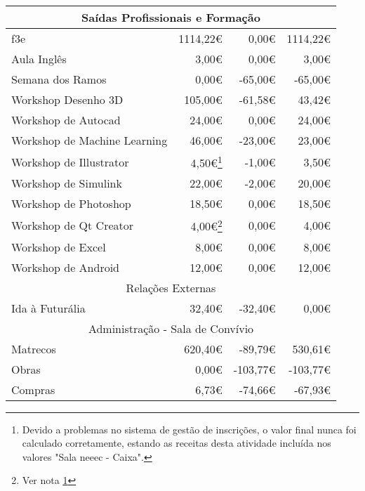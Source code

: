 \begin{longtable}{Xrrr}
\hline
\multicolumn{4}{c}{Saídas Profissionais e Formação} \\
\hline
\acrshort{f3e} & 1114,22€ & 0,00€ & 1114,22€ \\
Aula Inglês & 3,00€ & 0,00€ & 3,00€ \\
Semana dos Ramos & 0,00€ & -65,00€ & -65,00€ \\
Workshop Desenho 3D & 105,00€ & -61,58€ & 43,42€ \\
Workshop de Autocad & 24,00€ & 0,00€ & 24,00€ \\
Workshop de Machine Learning & 46,00€ & -23,00€ & 23,00€ \\
Workshop de Illustrator & 4,50€\footnote{\label{footnote:ws}Devido a problemas no sistema de gestão de inscrições, o valor final nunca foi calculado corretamente, estando as receitas desta atividade incluída nos valores "Sala \acrshort{neeec} - Caixa".} & -1,00€ & 3,50€ \\
Workshop de Simulink & 22,00€ & -2,00€ & 20,00€ \\
Workshop de Photoshop & 18,50€ & 0,00€ & 18,50€ \\
Workshop de Qt Creator & 4,00€\footnote{Ver nota \ref{footnote:ws}} & 0,00€ & 4,00€ \\
Workshop de Excel & 8,00€ & 0,00€ & 8,00€ \\
Workshop de Android & 12,00€ & 0,00€ & 12,00€ \\

\hline
\multicolumn{4}{c}{Relações Externas} \\
\hline
Ida à Futurália & 32,40€ & -32,40€ & 0,00€ \\

\hline
\multicolumn{4}{c}{Administração - Sala de Convívio} \\
\hline
Matrecos & 620,40€ & -89,79€ & 530,61€ \\
Obras & 0,00€ & -103,77€ & -103,77€ \\
Compras & 6,73€ & -74,66€ & -67,93€ \\


\end{longtable}
